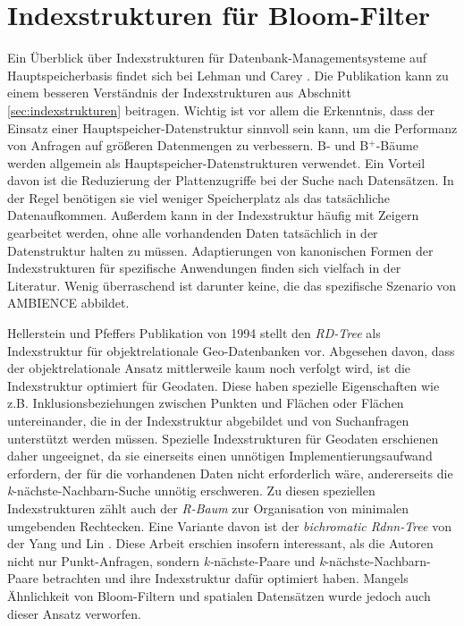 \section{Indexstrukturen für Bloom-Filter}\label{sec:bloom-index}
Ein Überblick über Indexstrukturen für Datenbank-Managementsysteme auf Hauptspei\-cher\-basis findet sich bei Lehman und Carey \cite{Lehman1986}. Die Publikation kann zu einem besseren Verständnis der Indexstrukturen aus Abschnitt \ref{sec:indexstrukturen} beitragen. Wichtig ist vor allem die Erkenntnis, dass der Einsatz einer Hauptspeicher-Datenstruktur sinnvoll sein kann, um die Performanz von Anfragen auf größeren Datenmengen zu verbessern. B- und B$^+$-Bäume werden allgemein als Hauptspeicher-Datenstruk\-turen verwendet. Ein Vorteil davon ist die Reduzierung der Plattenzugriffe bei der Suche nach Datensätzen. In der Regel benötigen sie viel weniger Speicherplatz als das tatsächliche Datenaufkommen. Außerdem kann in der Indexstruktur häufig mit Zeigern gearbeitet werden, ohne alle vorhandenden Daten tatsächlich in der Datenstruktur halten zu müssen. Adaptierungen von kanonischen Formen der Indexstrukturen für spezifische Anwendungen finden sich vielfach in der Literatur. Wenig überraschend ist darunter keine, die das spezifische Szenario von AMBIENCE abbildet.

Hellerstein und Pfeffers \cite{Hellerstein1994} Publikation von 1994 stellt den \textit{RD-Tree} als Indexstruktur für objektrelationale Geo-Datenbanken vor. Abgesehen davon, dass der objektrelationale Ansatz mittlerweile kaum noch verfolgt wird, ist die Indexstruktur optimiert für Geodaten. Diese haben spezielle Eigenschaften wie z.B. Inklusionsbeziehungen zwischen Punkten und Flächen oder Flächen untereinander, die in der Indexstruktur abgebildet und von Suchanfragen unterstützt werden müssen. Spezielle Indexstrukturen für Geodaten erschienen daher ungeeignet, da sie einerseits einen unnötigen Implementierungsaufwand erfordern, der für die vorhandenen Daten nicht erforderlich wäre, andererseits die \textit{k}-nächste-Nachbarn-Suche unnötig erschweren. Zu diesen speziellen Indexstrukturen zählt auch der \textit{R-Baum} zur Organisation von minimalen umgebenden Rechtecken. Eine Variante davon ist der \textit{bichromatic Rdnn-Tree} von der Yang und Lin \cite{Yang2002}. Diese Arbeit erschien insofern interessant, als die Autoren nicht nur Punkt-Anfragen, sondern \textit{k-}nächste-Paare und \textit{k}-nächste-Nachbarn-Paare betrachten und ihre Indexstruktur dafür optimiert haben. Mangels Ähnlichkeit von Bloom-Filtern und spatialen Datensätzen wurde jedoch auch dieser Ansatz verworfen. 

